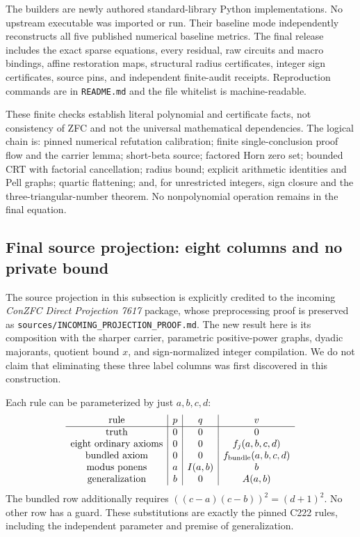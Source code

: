 The builders are newly authored standard-library Python implementations.
No upstream executable was imported or run.  Their baseline mode
independently reconstructs all five published numerical baseline metrics.
The final release includes the exact sparse equations, every residual,
raw circuits and macro bindings, affine restoration maps, structural
radius certificates, integer sign certificates, source pins, and
independent finite-audit receipts.  Reproduction commands are in
\texttt{README.md} and the file whitelist is machine-readable.

These finite checks establish literal polynomial and certificate facts,
not consistency of ZFC and not the universal mathematical dependencies.
The logical chain is: pinned numerical refutation calibration; finite
single-conclusion proof flow and the carrier lemma; short-beta source;
factored Horn zero set; bounded CRT with factorial cancellation; radius bound; explicit arithmetic
identities and Pell graphs; quartic flattening; and, for unrestricted
integers, sign closure and the three-triangular-number theorem.  No
nonpolynomial operation remains in the final equation.

\subsection{Final source projection: eight columns and no private bound}
\label{sec:projected-direct}

The source projection in this subsection is explicitly credited to the
incoming \emph{ConZFC Direct Projection 7617} package, whose preprocessing
proof is preserved as \texttt{sources/INCOMING\_PROJECTION\_PROOF.md}.
The new result here is its composition with the sharper carrier,
parametric positive-power graphs, dyadic majorants, quotient bound $x$,
and sign-normalized integer compilation.  We do not claim that eliminating
these three label columns was first discovered in this construction.

Each rule can be parameterized by just $a,b,c,d$:
\[
\begin{array}{c|c|c|c}
 \text{rule}&p&q&v\\ \hline
 \text{truth}&0&0&0\\
 \text{eight ordinary axioms}&0&0&f_j(a,b,c,d)\\
 \text{bundled axiom}&0&0&f_{\rm bundle}(a,b,c,d)\\
 \text{modus ponens}&a&I(a,b)&b\\
 \text{generalization}&b&0&A(a,b)
\end{array}
\]
The bundled row additionally requires
$((c-a)(c-b))^2=(d+1)^2$.  No other row has a guard.  These substitutions
are exactly the pinned C222 rules, including the independent
parameter and premise of generalization.

